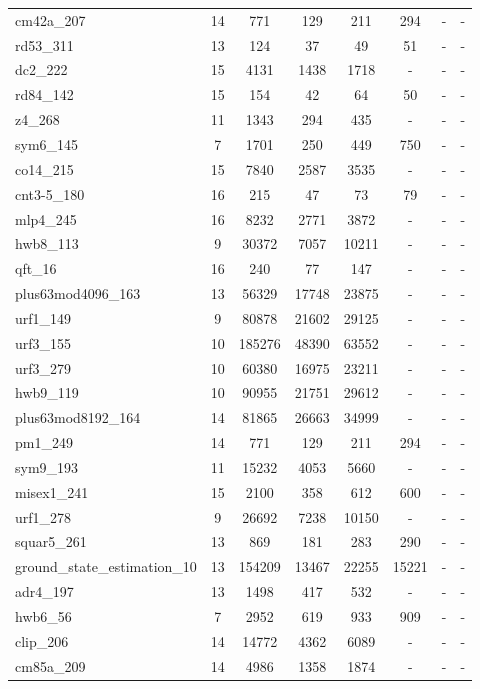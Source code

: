 \documentclass[journal]{IEEEtran}
\begin{document}
\begin{table*}[htbp]
\begin{center}
\begin{tabular}{|p{4.3cm}<{\centering}|c|c|c|c|c|c|c|}
				cm42a\_207 & 14 & 771 & 129 & 211 & 294 & - & - \\ 
				rd53\_311 & 13 & 124 & 37 & 49 & 51 & - & - \\ 
				dc2\_222 & 15 & 4131 & 1438 & 1718 & - & - & - \\ 
				rd84\_142 & 15 & 154 & 42 & 64 & 50 & - & - \\ 
				z4\_268 & 11 & 1343 & 294 & 435 & - & - & - \\ 
				sym6\_145 & 7 & 1701 & 250 & 449 & 750 & - & - \\ 
				co14\_215 & 15 & 7840 & 2587 & 3535 & - & - & - \\ 
				cnt3-5\_180 & 16 & 215 & 47 & 73 & 79 & - & - \\ 
				mlp4\_245 & 16 & 8232 & 2771 & 3872 & - & - & - \\ 
				hwb8\_113 & 9 & 30372 & 7057 & 10211 & - & - & - \\ 
				qft\_16 & 16 & 240 & 77 & 147 & - & - & - \\ 
				plus63mod4096\_163 & 13 & 56329 & 17748 & 23875 & - & - & - \\ 
				urf1\_149 & 9 & 80878 & 21602 & 29125 & - & - & - \\ 
				urf3\_155 & 10 & 185276 & 48390 & 63552 & - & - & - \\ 
				urf3\_279 & 10 & 60380 & 16975 & 23211 & - & - & - \\ 
				hwb9\_119 & 10 & 90955 & 21751 & 29612 & - & - & - \\ 
				plus63mod8192\_164 & 14 & 81865 & 26663 & 34999 & - & - & - \\ 
				pm1\_249 & 14 & 771 & 129 & 211 & 294 & - & - \\ 
				sym9\_193 & 11 & 15232 & 4053 & 5660 & - & - & - \\ 
				misex1\_241 & 15 & 2100 & 358 & 612 & 600 & - & - \\ 
				urf1\_278 & 9 & 26692 & 7238 & 10150 & - & - & - \\ 
				squar5\_261 & 13 & 869 & 181 & 283 & 290 & - & - \\ 
				ground\_state\_estimation\_10 & 13 & 154209 & 13467 & 22255 & 15221 & - & - \\ 
				adr4\_197 & 13 & 1498 & 417 & 532 & - & - & - \\ 
				hwb6\_56 & 7 & 2952 & 619 & 933 & 909 & - & - \\ 
				clip\_206 & 14 & 14772 & 4362 & 6089 & - & - & - \\ 
				cm85a\_209 & 14 & 4986 & 1358 & 1874 & - & - & - \\ 

\end{tabular}
\end{center}
\end{table*}
\end{document}
